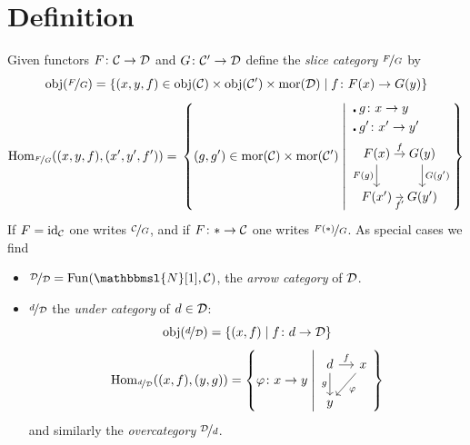     \section{Definition}
        Given functors $F \colon \mathcal{C} \to \mathcal{D}$ and $G \colon \mathcal{C}' \to \mathcal{D}$ define the \emph{slice category} $\nicefrac{F}{G}$ by
        \begin{equation*}
            \operatorname{obj}(\nicefrac{F}{G}) = \left\{ (x, y, f) \in \operatorname{obj}(\mathcal{C}) \times \operatorname{obj}(\mathcal{C}') \times \operatorname{mor}(\mathcal{D}) \mid f \colon F(x) \to G(y) \right\}
        \end{equation*}
        \begin{equation*}
            \Hom_{\nicefrac{F}{G}}((x,y,f),(x',y',f')) = \\
                \left\{
                    (g, g') \in \mor(\Cc) \times \mor(\Cc')
                    \;\middle|\;
                    \begin{alignedat}{1}
                        &\centerdot g \colon x \to y \\
                        &\centerdot g' \colon x' \to y' \\
                        &\begin{tikzcd}[column sep=tiny, cramped]
                            F(x) \arrow[d, "F(g)"'] \arrow[r, "f"] & G(y) \arrow[d, "G(g')"] \\
                            F(x') \arrow[r, "f'"']                 & G(y')                  
                        \end{tikzcd}
                    \end{alignedat}                
                \right\}
        \end{equation*}
        If $F = \operatorname{id}_{\mathcal{C}}$ one writes $\nicefrac{\mathcal{C}}{G}$, and if $F \colon * \to \mathcal{C}$ one writes $\nicefrac{F(*)}{G}$. As special cases we find
        \begin{itemize}
            \item 
                $\nicefrac{\Dd}{\Dd} = \Fun(\mathbbmsl{N}[1], \Cc)$, the \emph{arrow category} of $\mathcal{D}$.
            \item 
                $\nicefrac{d}{\mathcal{D}}$ the \emph{under category} of $d \in \mathcal{D}$:
                \begin{equation*}
                    \operatorname{obj}(\nicefrac{d}{\mathcal{D}}) = \left\{ (x, f) \mid f \colon d \to \mathcal{D} \right\}
                \end{equation*}
                \begin{equation*}
                    \Hom_{\nicefrac{d}{\Dd}}((x,f),(y,g)) = 
                    \left\{ 
                        \varphi \colon x \to y 
                        \;\middle|\;
                        \begin{tikzcd}[column sep=small]
                            d \arrow[d, "g"'] \arrow[r, "f"] & x \arrow[ld, "\varphi"] \\
                            y                                &                        
                        \end{tikzcd}
                    \right\}
                \end{equation*}
                and similarly the \emph{overcategory} $\nicefrac{\mathcal{D}}{d}$.
        \end{itemize}
